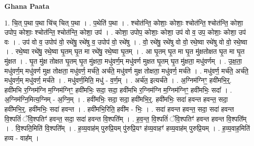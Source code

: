 \documentclass[17pt]{extarticle}
\begin{document}
\textbf{Ghana Paata } \newline

1. चि॒त् प॒था प॒था चि॑च् चित् प॒था । . प॒थेति॑ प॒था । . श्चोत॑न्ति॒ कोशाः॒ कोशाः॒ श्चोत॑न्ति॒ श्चोत॑न्ति॒ कोशा॒ उपोप॒ कोशाः॒ श्चोत॑न्ति॒ श्चोत॑न्ति॒ कोशा॒ उप॑ । . कोशा॒ उपोप॒ कोशाः॒ कोशा॒ उप॑ वो व॒ उप॒ कोशाः॒ कोशा॒ उप॑ वः । . उप॑ वो व॒ उपोप॑ वो॒ रथे॑षु॒ रथे॑षु व॒ उपोप॑ वो॒ रथे॑षु । . वो॒ रथे॑षु॒ रथे॑षु वो वो॒ रथे॒ष्वा रथे॑षु वो वो॒ रथे॒ष्वा । . रथे॒ष्वा रथे॑षु॒ रथे॒ष्वा घृ॒तम् घृ॒त मा रथे॑षु॒ रथे॒ष्वा घृ॒तम् । . आ घृ॒तम् घृ॒त मा घृ॒त मु॑क्षतोक्षत घृ॒त मा घृ॒त मु॑क्षत । . घृ॒त मु॑क्ष तोक्षत घृ॒तम् घृ॒त मु॑क्षता॒ मधु॑वर्ण॒म् मधु॑वर्ण मुक्षत घृ॒तम् घृ॒त मु॑क्षता॒ मधु॑वर्णम् । . उ॒क्ष॒ता॒ मधु॑वर्ण॒म् मधु॑वर्ण मुक्ष तोक्षता॒ मधु॑वर्ण॒ मर्च॑ते॒ अर्च॑ते॒ मधु॑वर्ण मुक्ष तोक्षता॒ मधु॑वर्ण॒ मर्च॑ते । . मधु॑वर्ण॒ मर्च॑ते॒ अर्च॑ते॒ मधु॑वर्ण॒म् मधु॑वर्ण॒ मर्च॑ते । . मधु॑वर्ण॒मिति॒ मधु॑ - व॒र्ण॒म् । . अर्च॑त॒ इत्यर्च॑ते । . अ॒ग्निम॑ग्निꣳ॒॒ हवी॑मभि॒र्॒. हवी॑मभि र॒ग्निम॑ग्नि म॒ग्निम॑ग्निꣳ॒॒ हवी॑मभिः॒ सदा॒ सदा॒ हवी॑मभि र॒ग्निम॑ग्नि म॒ग्निम॑ग्निꣳ॒॒ हवी॑मभिः॒ सदा᳚ । . अ॒ग्निम॑ग्नि॒मित्य॒ग्निम् - अ॒ग्नि॒म् । . हवी॑मभिः॒ सदा॒ सदा॒ हवी॑मभि॒र्॒. हवी॑मभिः॒ सदा॑ हवन्त हवन्त॒ सदा॒ हवी॑मभि॒र्॒. हवी॑मभिः॒ सदा॑ हवन्त । . हवी॑मभि॒रिति॒ हवी॑म - भिः॒ । . सदा॑ हवन्त हवन्त॒ सदा॒ सदा॑ हवन्त वि॒श्पतिं॑ ॅवि॒श्पतिꣳ॑ हवन्त॒ सदा॒ सदा॑ हवन्त वि॒श्पति᳚म् । . ह॒व॒न्त॒ वि॒श्पतिं॑ ॅवि॒श्पतिꣳ॑ हवन्त हवन्त वि॒श्पति᳚म् । . वि॒श्पति॒मिति॑ वि॒श्पति᳚म् । . ह॒व्य॒वाह॑म् पुरुप्रि॒यम् पु॑रुप्रि॒यꣳ ह॑व्य॒वाहꣳ॑ हव्य॒वाह॑म् पुरुप्रि॒यम् । . ह॒व्य॒वाह॒मिति॑ हव्य - वाह᳚म् । \newline
\end{document}
